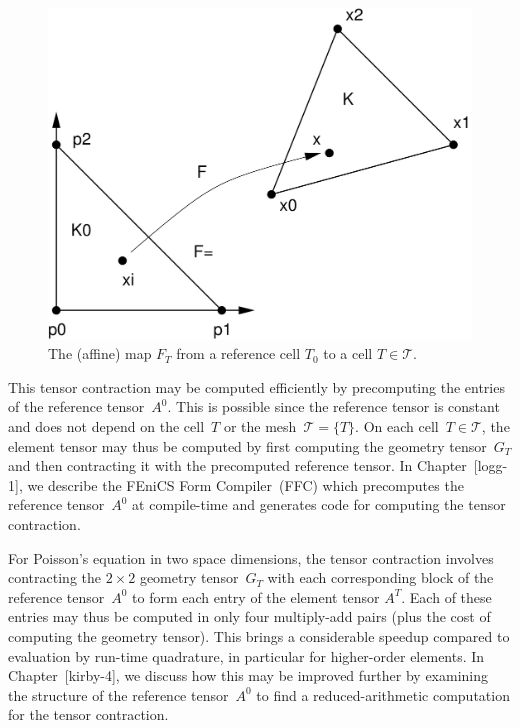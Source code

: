 \begin{figure}[htbp]
  \begin{center}
    \includegraphics[width=12cm]{chapters/kirby-8/pdf/affinemap.pdf}
    \caption{The (affine) map $F_T$ from a reference cell $T_0$
      to a cell $T \in \mathcal{T}$.}
    \label{fig:affinemap}
  \end{center}
\end{figure}

This tensor contraction may be computed efficiently by precomputing
the entries of the reference tensor~$A^0$. This is possible since the
reference tensor is constant and does not depend on the cell~$T$ or
the mesh~$\mathcal{T} = \{T\}$. On each cell~$T \in \mathcal{T}$, the
element tensor may thus be computed by first computing the geometry
tensor~$G_T$ and then contracting it with the precomputed reference
tensor. In Chapter~[logg-1], we describe the FEniCS Form
Compiler~(FFC) which precomputes the reference tensor~$A^0$ at
compile-time and generates code for computing the tensor contraction.

For Poisson's equation in two space dimensions, the tensor contraction
involves contracting the $2 \times 2$ geometry tensor~$G_T$ with each
corresponding block of the reference tensor~$A^0$ to form each entry
of the element tensor $A^T$. Each of these entries may thus be
computed in only four multiply-add pairs (plus the cost of computing
the geometry tensor). This brings a considerable speedup compared to
evaluation by run-time quadrature, in particular for higher-order
elements. In Chapter~[kirby-4], we discuss how this may be improved
further by examining the structure of the reference tensor~$A^0$ to
find a reduced-arithmetic computation for the tensor contraction.

